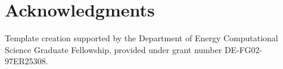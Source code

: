 \documentclass{article}                                                                           %
\begin{document}
\pagebreak
\section*{Acknowledgments}

Template creation supported by the Department of Energy Computational Science Graduate Fellowship, provided under grant number DE-FG02-97ER25308.

\pagebreak


\end{document}
